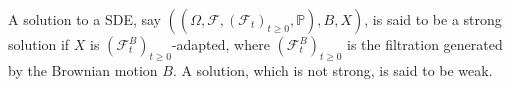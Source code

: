 A solution to a SDE, say $\left((\Omega,\mathcal{F},(\mathcal{F}_{t})_{t\geq 0},\mathbb{P}),B,X\right)$, is said to be a strong solution if $X$ is $(\mathcal{F}_{t}^{B})_{t\geq 0}$-adapted, where $(\mathcal{F}_{t}^{B})_{t\geq 0}$ is the filtration generated by the Brownian motion $B$.
A solution, which is not strong, is said to be weak. 

